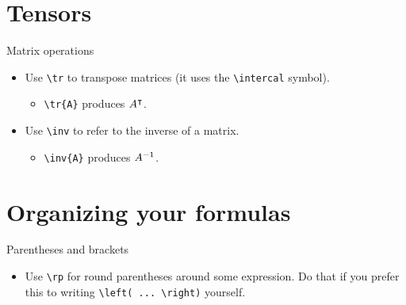 \documentclass{beamer}
\begin{document}
\section{Tensors}
\label{sec:tensors}

    \begin{frame}[fragile]{Matrix operations}
        \begin{itemize}
            \item Use \verb!\tr! to \alert{transpose} matrices (it uses the \verb!\intercal! symbol).
                \begin{itemize}
                    \item \verb!\tr{A}! produces ${A}^{\intercal}$.
                \end{itemize}
            \item Use \verb!\inv! to refer to the \alert{inverse} of a matrix.
            \begin{itemize}
                \item \verb!\inv{A}! produces ${A}^{-1}$.
            \end{itemize}
        \end{itemize}
    \end{frame}

\section{Organizing your formulas}
\label{sec:org}

    \begin{frame}[fragile]{Parentheses and brackets}
        \begin{itemize}
            \item Use \verb!\rp! for \alert{round parentheses} around some expression.
            Do that if you prefer this to writing \verb!\left( ... \right)! yourself.
        \end{itemize}
    \end{frame}
\end{document}
